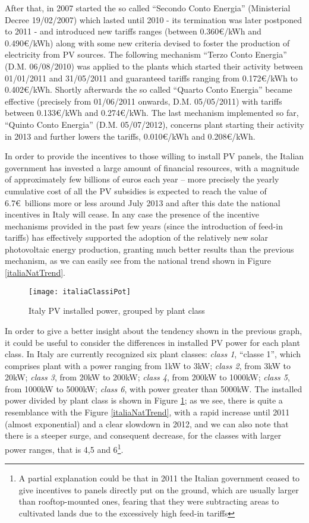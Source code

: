 \documentclass[12pt,a4paper,openright,twoside]{report}
\begin{document}
After that, in 2007 started the so called ``Secondo Conto Energia'' (Ministerial Decree 19/02/2007) which lasted until 2010 - its termination was later postponed to 2011 - and introduced new tariffs ranges (between 0.360\euro/kWh and 0.490\euro/kWh) along with some new criteria devised to foster the production of electricity from PV sources. The following mechanism ``Terzo Conto Energia'' (D.M. 06/08/2010) was applied to the plants which started their activity between 01/01/2011 and 31/05/2011 and guaranteed tariffs ranging from 0.172\euro/kWh to 0.402\euro/kWh.
Shortly afterwards the so called ``Quarto Conto Energia'' became effective (precisely from 01/06/2011 onwards, D.M. 05/05/2011) with tariffs between 0.133\euro/kWh and 0.274\euro/kWh. The last mechanism implemented so far, ``Quinto Conto Energia'' (D.M. 05/07/2012), concerns plant starting their activity in 2013 and further lowers the tariffs, 0.010\euro/kWh and 0.208\euro/kWh. 

In order to provide the incentives to those willing to install PV panels, the Italian government has invested a large amount of financial resources, with a magnitude of approximately few billions of euros each year – more precisely the yearly cumulative cost of all the PV subsidies is expected to reach the value of 6.7\euro\ billions more or less around July 2013 and after this date the national incentives in Italy will cease. In any case the presence of  the incentive mechanisms provided in the past few years (since the introduction of feed-in tariffs) has effectively supported the adoption of the relatively new solar photovoltaic energy production, granting much better results than the previous mechanism, as we can easily see from the national trend shown in Figure \ref{italiaNatTrend}.

\begin{figure}[h]
	\centering
	\texttt{[image: italiaClassiPot]}
	\caption{Italy PV installed power, grouped by plant class}
	\label{italiaClassiPot}
\end{figure}


In order to give a better insight about the tendency shown in the previous graph, it could be useful to consider the differences in installed PV power for each plant class. In Italy are currently recognized six plant classes: \emph{class 1}, ``classe 1'', which comprises plant with a power ranging from 1kW to 3kW; \emph{class 2}, from 3kW to 20kW; \emph{class 3}, from 20kW to 200kW; \emph{class 4}, from 200kW to 1000kW; \emph{class 5}, from 1000kW to 5000kW; \emph{class 6}, with power greater than 5000kW. The installed power divided by plant class is shown in Figure \ref{italiaClassiPot}; as we see, there is quite a resemblance with the Figure \ref{italiaNatTrend}, with a rapid increase until 2011 (almost exponential) and a clear slowdown in 2012, and we can also note that there is a steeper surge, and consequent decrease, for the classes with larger power ranges, that is 4,5 and 6\footnote{A partial explanation could be that in 2011 the Italian government ceased to give incentives to panels directly put on the ground, which are usually larger than rooftop-mounted ones, fearing that they were subtracting areas to cultivated lands due to the excessively high feed-in tariffs}.
\end{document}
